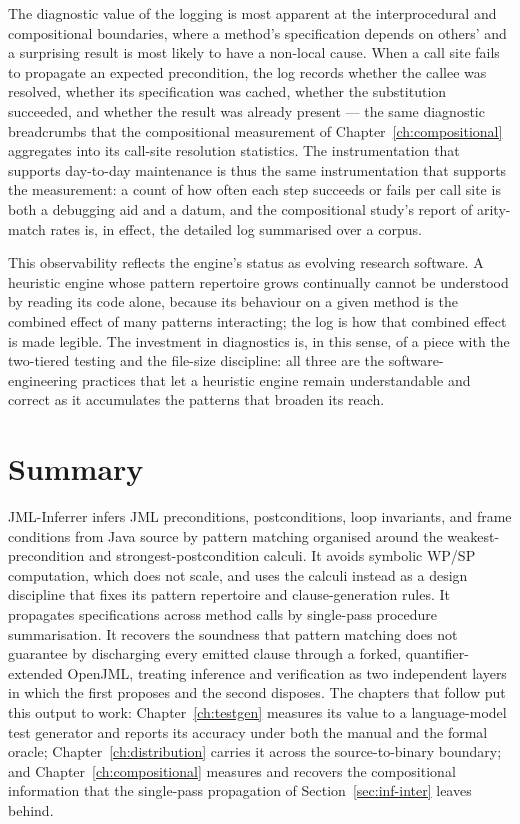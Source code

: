 The diagnostic value of the logging is most apparent at the interprocedural and
compositional boundaries, where a method's specification depends on others' and a
surprising result is most likely to have a non-local cause. When a call site fails
to propagate an expected precondition, the log records whether the callee was
resolved, whether its specification was cached, whether the substitution succeeded,
and whether the result was already present --- the same diagnostic breadcrumbs that
the compositional measurement of Chapter~\ref{ch:compositional} aggregates into its
call-site resolution statistics. The instrumentation that supports day-to-day
maintenance is thus the same instrumentation that supports the measurement: a count
of how often each step succeeds or fails per call site is both a debugging aid and a
datum, and the compositional study's report of arity-match rates is, in effect, the
detailed log summarised over a corpus.

This observability reflects the engine's status as evolving research software. A
heuristic engine whose pattern repertoire grows continually cannot be understood by
reading its code alone, because its behaviour on a given method is the combined
effect of many patterns interacting; the log is how that combined effect is made
legible. The investment in diagnostics is, in this sense, of a piece with the
two-tiered testing and the file-size discipline: all three are the
software-engineering practices that let a heuristic engine remain understandable and
correct as it accumulates the patterns that broaden its reach.

\section{Summary}

JML-Inferrer infers JML preconditions, postconditions, loop invariants, and
frame conditions from Java source by pattern matching organised around the
weakest-precondition and strongest-postcondition calculi. It avoids symbolic
WP/SP computation, which does not scale, and uses the calculi instead as a
design discipline that fixes its pattern repertoire and clause-generation
rules. It propagates specifications across method calls by single-pass
procedure summarisation. It recovers the soundness that pattern matching does
not guarantee by discharging every emitted clause through a forked, quantifier-
extended OpenJML, treating inference and verification as two independent layers
in which the first proposes and the second disposes. The chapters that follow
put this output to work: Chapter~\ref{ch:testgen} measures its value to a
language-model test generator and reports its accuracy under both the manual
and the formal oracle; Chapter~\ref{ch:distribution} carries it across the
source-to-binary boundary; and Chapter~\ref{ch:compositional} measures and
recovers the compositional information that the single-pass propagation of
Section~\ref{sec:inf-inter} leaves behind.
